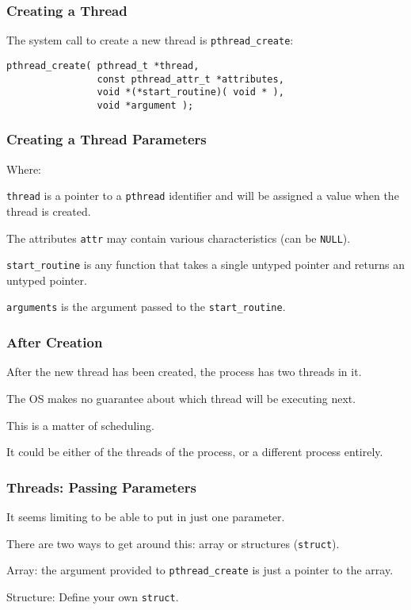 \begin{frame}[fragile]
\frametitle{Creating a Thread}
 The system call to create a new thread is \texttt{pthread\_create}:

\begin{verbatim}
pthread_create( pthread_t *thread,
                const pthread_attr_t *attributes,
                void *(*start_routine)( void * ),
                void *argument );
\end{verbatim}


\end{frame}


\begin{frame}
\frametitle{Creating a Thread Parameters}

Where: 

\texttt{thread} is a pointer to a \texttt{pthread} identifier and will be assigned a value when the thread is created. 

The attributes \texttt{attr} may contain various characteristics (can be \texttt{NULL}). 

\texttt{start\_routine} is any function that takes a single untyped pointer and returns an untyped pointer. 

\texttt{arguments} is the argument passed to the \texttt{start\_routine}.

\end{frame}


\begin{frame}
\frametitle{After Creation}

After the new thread has been created, the process has two threads in it. 

The OS makes no guarantee about which thread will be executing next.

This is a matter of scheduling. 

It could be either of the threads of the process, or a different process entirely.


\end{frame}


\begin{frame}
\frametitle{Threads: Passing Parameters}

It seems limiting to be able to put in just one parameter. 

There are two ways to get around this: array or structures (\texttt{struct}). 

Array: the argument provided to \texttt{pthread\_create} is just a pointer to the array.

Structure: Define your own \texttt{struct}.


\end{frame}


